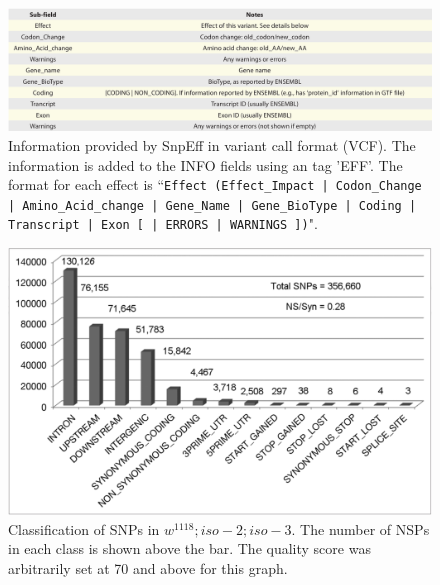 \begin{figure}
    \centering
    \includegraphics[width=14cm]{snpeff_table4.png}
    \caption{Information provided by SnpEff in variant call format (VCF). The information is added to the INFO fields using an tag 'EFF'. The format for each effect is ``\texttt{Effect (Effect\_Impact | Codon\_Change | Amino\_Acid\_change | Gene\_Name | Gene\_BioType | Coding | Transcript | Exon [ | ERRORS | WARNINGS ])}".}
    \label{fig:snpeffTab3}
\end{figure}

\begin{figure}
    \centering
    \includegraphics[width=14cm]{snpeff_fig1.png}
    \caption{Classification of SNPs in $w^{1118} ; iso-2; iso-3$. The number of NSPs in each class is shown above the bar. The quality score was arbitrarily set at 70 and above for this graph.}
    \label{fig:snpeffTab3}
\end{figure}

